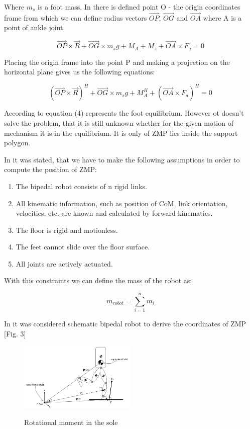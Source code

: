 \documentclass[11pt,a4paper]{article}
\begin{document}
Where $m_s$ is a foot mass. In \cite{vukobratovic2004zero} there is defined  point O - the origin coordinates frame from which we can define radius vectors $\vec{OP}$, $\vec{OG}$ and $\vec{OA}$ where A is a point of ankle joint.

	\begin{equation}
		\vec{OP} \times \vec{R} + \vec{OG} \times m_sg + M_A + M_z + \vec{OA} \times F_a = 0
	\end{equation}

Placing the origin frame into the point P and making a projection on the horizontal plane gives us the following equations: 

	\begin{equation}
		(\vec{OP} \times \vec{R})^H + \vec{OG} \times m_sg + M_A^H + (\vec{OA} \times F_a)^H = 0
	\end{equation}

According to \cite{vukobratovic2004zero} equation (4) represents the foot equilibrium. However ot doesn't solve the problem, that it is still unknown whether for the given motion of mechanism it is in the equilibrium. It is only of ZMP lies inside the support polygon.

In \cite{dekker2009zero} it was stated, that we have to make the following assumptions in order to compute the position of ZMP:

	\begin{enumerate}
		\item
			The bipedal robot consists of n rigid links.
		\item
			All kinematic information, such as position of CoM, link orientation, velocities, etc. are known and calculated by forward kinematics.
		\item
			The floor is rigid and motionless.
		\item
			The feet cannot slide over the floor surface.
		\item
			All joints are actively actuated.
	\end{enumerate}
	
With this constraints we can define the mass of the robot as:
	
	\begin{equation}
		m_{robot} = \sum^n_{i=1}{m_i}
	\end{equation}

In \cite{dekker2009zero} it was considered schematic bipedal robot to derive the coordinates of ZMP [Fig. 3]

	\begin{figure}[h!]
		\vspace{-0.2cm}
		\centering
		{\includegraphics[width=0.5\textwidth]{3}}
		\caption{Rotational moment in the sole}
		\label{fig:3}
		\vspace{-0.1cm}
	\end{figure}
\end{document}
